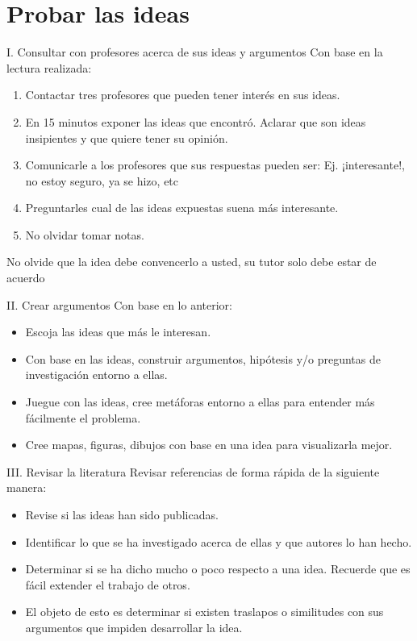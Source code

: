 \documentclass [xcolor=svgnames, t] {beamer}
\begin{document}
\section{Probar las ideas}
\begin{frame}{I. Consultar con profesores acerca de sus ideas y argumentos}
Con base en la lectura realizada:
\begin{enumerate}
\item Contactar tres profesores que pueden tener inter\'es en sus ideas.
\item En 15 minutos exponer las ideas que encontr\'o. Aclarar que son ideas insipientes y que quiere tener su opini\'on.
\item Comunicarle a los profesores que sus respuestas pueden ser: Ej. ¡interesante!, no estoy seguro, ya se hizo, etc
\item Preguntarles cual de las ideas expuestas suena m\'as interesante.
\item No olvidar tomar notas. 
\end{enumerate}
\centering
\alert{No olvide que la idea debe convencerlo a usted, su tutor solo debe estar de acuerdo}
\end{frame}

\begin{frame}{II. Crear argumentos}
Con base en lo anterior:
\begin{itemize}
\item Escoja las ideas que m\'as le interesan.
\item Con base en las ideas, construir argumentos, hip\'otesis y/o preguntas de investigaci\'on entorno a ellas. 
\item Juegue con las ideas, cree met\'aforas entorno a ellas para entender m\'as fácilmente el problema.
\item Cree mapas, figuras, dibujos con base en una idea para visualizarla mejor.
\end{itemize}
\end{frame}

\begin{frame}{III. Revisar la literatura}
Revisar referencias de forma r\'apida de la siguiente manera:
\begin{itemize}
\item Revise si las ideas han sido publicadas.
\item Identificar lo que se ha investigado acerca de ellas y que autores lo han hecho.
\item Determinar si se ha dicho mucho o poco respecto a una idea. Recuerde que es f\'acil extender el trabajo de otros.
\item El objeto de esto es determinar si existen traslapos o similitudes con sus argumentos que impiden desarrollar la idea.
\end{itemize}
\end{frame}
\end{document}

